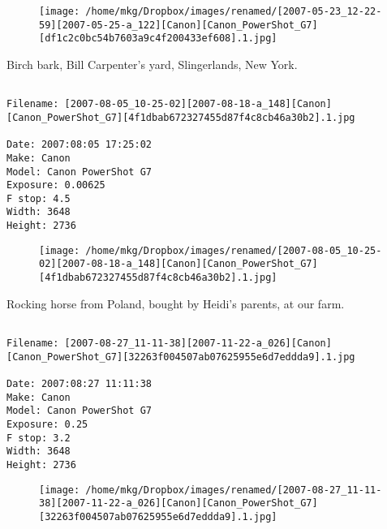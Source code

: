 \begin{figure}
\texttt{[image: /home/mkg/Dropbox/images/renamed/[2007-05-23\_12-22-59][2007-05-25-a\_122][Canon][Canon\_PowerShot\_G7][df1c2c0bc54b7603a9c4f200433ef608].1.jpg]}
\end{figure}
    
\clearpage
\onecolumn
\noindent Birch bark, Bill Carpenter's yard, Slingerlands, New York.
\noindent
\begin{lstlisting}

Filename: [2007-08-05_10-25-02][2007-08-18-a_148][Canon][Canon_PowerShot_G7][4f1dbab672327455d87f4c8cb46a30b2].1.jpg

Date: 2007:08:05 17:25:02
Make: Canon
Model: Canon PowerShot G7
Exposure: 0.00625
F stop: 4.5
Width: 3648
Height: 2736
\end{lstlisting}
\clearpage

\begin{figure}
\texttt{[image: /home/mkg/Dropbox/images/renamed/[2007-08-05\_10-25-02][2007-08-18-a\_148][Canon][Canon\_PowerShot\_G7][4f1dbab672327455d87f4c8cb46a30b2].1.jpg]}
\end{figure}
    
\clearpage
\onecolumn
\noindent Rocking horse from Poland, bought by Heidi's parents, at our farm.
\noindent
\begin{lstlisting}

Filename: [2007-08-27_11-11-38][2007-11-22-a_026][Canon][Canon_PowerShot_G7][32263f004507ab07625955e6d7eddda9].1.jpg

Date: 2007:08:27 11:11:38
Make: Canon
Model: Canon PowerShot G7
Exposure: 0.25
F stop: 3.2
Width: 3648
Height: 2736
\end{lstlisting}
\clearpage

\begin{figure}
\texttt{[image: /home/mkg/Dropbox/images/renamed/[2007-08-27\_11-11-38][2007-11-22-a\_026][Canon][Canon\_PowerShot\_G7][32263f004507ab07625955e6d7eddda9].1.jpg]}
\end{figure}
    
